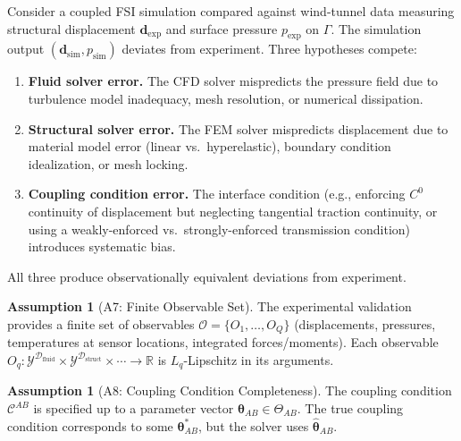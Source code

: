 \documentclass[11pt,a4paper]{article}
\theoremstyle{definition}
\newtheorem{assumption}[theorem]{Assumption}
\newcommand{\R}{\mathbb{R}}
\newcommand{\domFluid}{\mathcal{D}_{\mathrm{fluid}}}
\newcommand{\domStruct}{\mathcal{D}_{\mathrm{struct}}}
\newcommand{\interface}{\Gamma}
\begin{document}
Consider a coupled FSI simulation compared against wind-tunnel data measuring structural displacement $\mathbf{d}_{\mathrm{exp}}$ and surface pressure $p_{\mathrm{exp}}$ on $\interface$. The simulation output $(\mathbf{d}_{\mathrm{sim}}, p_{\mathrm{sim}})$ deviates from experiment. Three hypotheses compete:

\begin{enumerate}[label=H\arabic*:,leftmargin=*]
    \item \textbf{Fluid solver error.} The CFD solver mispredicts the pressure field due to turbulence model inadequacy, mesh resolution, or numerical dissipation.
    \item \textbf{Structural solver error.} The FEM solver mispredicts displacement due to material model error (linear vs.\ hyperelastic), boundary condition idealization, or mesh locking.
    \item \textbf{Coupling condition error.} The interface condition (e.g., enforcing $C^0$ continuity of displacement but neglecting tangential traction continuity, or using a weakly-enforced vs.\ strongly-enforced transmission condition) introduces systematic bias.
\end{enumerate}

All three produce observationally equivalent deviations from experiment.

\begin{assumption}[A7: Finite Observable Set]\label{ass:A7}
The experimental validation provides a finite set of observables $\mathcal{O} = \{O_1, \ldots, O_Q\}$ (displacements, pressures, temperatures at sensor locations, integrated forces/moments). Each observable $O_q: \mathcal{Y}^{\domFluid} \times \mathcal{Y}^{\domStruct} \times \cdots \to \R$ is $L_q$-Lipschitz in its arguments.
\end{assumption}

\begin{assumption}[A8: Coupling Condition Completeness]\label{ass:A8}
The coupling condition $\mathcal{C}^{AB}$ is specified up to a parameter vector $\boldsymbol{\theta}_{AB} \in \Theta_{AB}$. The true coupling condition corresponds to some $\boldsymbol{\theta}_{AB}^*$, but the solver uses $\hat{\boldsymbol{\theta}}_{AB}$.
\end{assumption}
\end{document}
